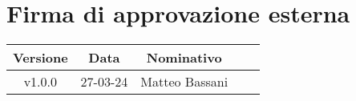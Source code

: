 \section*{Firma di approvazione esterna}
    \begin{table}[!ht]
        \centering
        \renewcommand{\arraystretch}{1.5}
        \begin{tabularx}{0.98\textwidth}
            {c c c >{\centering\arraybackslash}X X}
            \rowcolor{black}
            \textbf{\color{white} Versione} & \textbf{\color{white} Data} & \textbf{\color{white} Nominativo} & \multicolumn{2}{c}{\textbf{\color{white} Firma}}\\ 
            \hline
            
            \multirow{2}{*}{v1.0.0} &\multirow{2}{*}{27-03-24} &\multirow{2}{*}{Matteo Bassani} &&\\

            &&&\multicolumn{2}{c}{\hrulefill}\\
            \hline
        \end{tabularx}
    \end{table}
